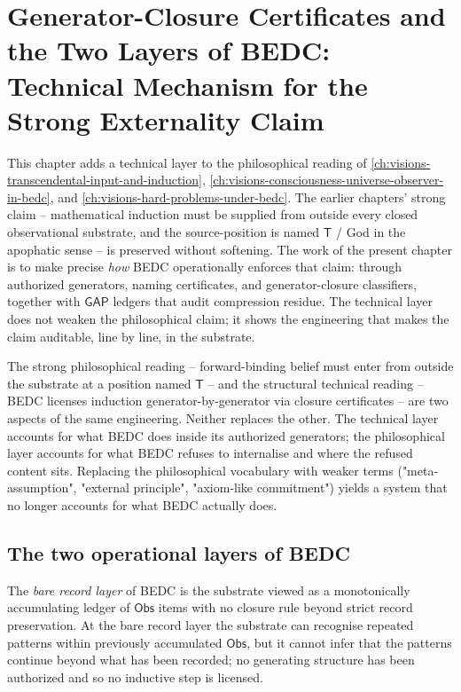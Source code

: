 \chapter{Generator-Closure Certificates and the Two Layers of BEDC: Technical Mechanism for the Strong Externality Claim}
\label{ch:visions-certificate-closure-and-generator-induction}

This chapter adds a technical layer to the philosophical reading of \autoref{ch:visions-transcendental-input-and-induction}, \autoref{ch:visions-consciousness-universe-observer-in-bedc}, and \autoref{ch:visions-hard-problems-under-bedc}. The earlier chapters' strong claim -- mathematical induction must be supplied from outside every closed observational substrate, and the source-position is named $\mathsf{T}$ / God in the apophatic sense -- is preserved without softening. The work of the present chapter is to make precise \emph{how} BEDC operationally enforces that claim: through authorized generators, naming certificates, and generator-closure classifiers, together with $\mathsf{GAP}$ ledgers that audit compression residue. The technical layer does not weaken the philosophical claim; it shows the engineering that makes the claim auditable, line by line, in the substrate.

\begin{principle}
\label{prin:certificate-closure-two-co-equal-layers}
The strong philosophical reading -- forward-binding belief must enter from outside the substrate at a position named $\mathsf{T}$ -- and the structural technical reading -- BEDC licenses induction generator-by-generator via closure certificates -- are two aspects of the same engineering. Neither replaces the other. The technical layer accounts for what BEDC does inside its authorized generators; the philosophical layer accounts for what BEDC refuses to internalise and where the refused content sits. Replacing the philosophical vocabulary with weaker terms ("meta-assumption", "external principle", "axiom-like commitment") yields a system that no longer accounts for what BEDC actually does.
\end{principle}

\section{The two operational layers of BEDC}
\label{sec:certificate-closure-two-layers}

\begin{definition}
\label{def:certificate-closure-bare-record-layer}
The \emph{bare record layer} of BEDC is the substrate viewed as a monotonically accumulating ledger of $\mathsf{Obs}$ items with no closure rule beyond strict record preservation. At the bare record layer the substrate can recognise repeated patterns within previously accumulated $\mathsf{Obs}$, but it cannot infer that the patterns continue beyond what has been recorded; no generating structure has been authorized and so no inductive step is licensed.
\end{definition}


